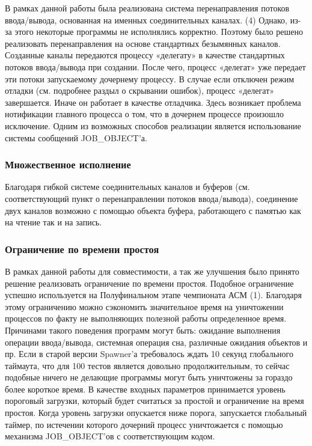 \documentclass{imcs}
\begin{document}
В рамках данной работы была реализована система перенаправления потоков ввода/вывода, основанная на именных соединительных каналах. (4) Однако, из-за этого некоторые программы не исполнялись корректно. Поэтому было решено реализовать перенаправления на основе стандартных безымянных каналов. Созданные каналы передаются процессу «делегату» в качестве стандартных потоков ввода/вывода при создании. После чего, процесс «делегат» уже передает эти потоки запускаемому дочернему процессу.
В случае если отключен режим отладки (см. подробнее раздыл о скрывании ошибок), процесс «делегат» завершается. Иначе он работает в качестве отладчика. Здесь возникает проблема нотификации главного процесса о том, что в дочернем процессе произошло исключение. Одним из возможных способов реализации является использование системы сообщений JOB\_OBJECT'а.

\subsubsection{Множественное исполнение}
Благодаря гибкой системе соединительных каналов и буферов (см. соответствующий пункт о перенаправлении потоков ввода/вывода), соединение двух каналов возможно с помощью объекта буфера, работающего с памятью как на чтение так и на запись.

\subsubsection{Ограничение по времени простоя}
В рамках данной работы для совместимости, а так же улучшения было принято решение реализовать ограничение по времени простоя. Подобное ограничение успешно используется на Полуфинальном этапе чемпионата АСМ (1).
Благодаря  этому ограничению можно сэкономить значительное время на уничтожении процессов по факту не выполняющих полезной работы определенное время. Причинами такого поведения программ могут быть: ожидание выполнения операции ввода/вывода, системная операция сна, различные ожидания объектов и пр. Если в старой версии Spawner'а требовалось ждать 10 секунд глобального таймаута, что для 100 тестов является довольно продолжительным, то сейчас подобные ничего не делающие программы могут быть уничтожены за гораздо более короткое время. 
В качестве входных параметров принимается уровень пороговый загрузки, который будет считаться за простой и ограничение на время простоя. Когда уровень загрузки опускается ниже порога, запускается глобальный таймер, по истечении которого дочерний процесс уничтожается с помощью механизма JOB\_OBJECT'ов с соответствующим кодом.
\end{document}
